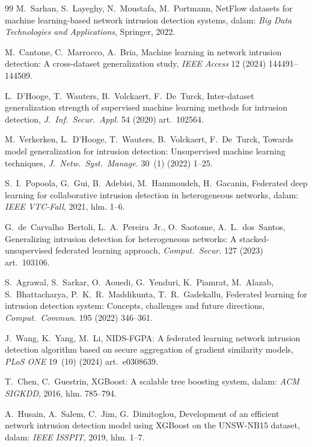 \documentclass[11pt,a4paper]{article}
\begin{document}
\begin{thebibliography}{99}
 M.~Sarhan, S.~Layeghy, N.~Moustafa, M.~Portmann, NetFlow datasets
for machine learning-based network intrusion detection systems, dalam: \emph{Big
Data Technologies and Applications}, Springer, 2022.

 M.~Cantone, C.~Marrocco, A.~Bria, Machine learning in network
intrusion detection: A cross-dataset generalization study, \emph{IEEE Access} 12
(2024) 144491--144509.

 L.~D'Hooge, T.~Wauters, B.~Volckaert, F.~De~Turck, Inter-dataset
generalization strength of supervised machine learning methods for intrusion
detection, \emph{J.\ Inf.\ Secur.\ Appl.} 54 (2020) art.~102564.

 M.~Verkerken, L.~D'Hooge, T.~Wauters, B.~Volckaert, F.~De~Turck,
Towards model generalization for intrusion detection: Unsupervised machine learning
techniques, \emph{J.\ Netw.\ Syst.\ Manage.} 30~(1) (2022) 1--25.

 S.~I.~Popoola, G.~Gui, B.~Adebisi, M.~Hammoudeh, H.~Gacanin,
Federated deep learning for collaborative intrusion detection in heterogeneous
networks, dalam: \emph{IEEE VTC-Fall}, 2021, hlm. 1--6.

 G.~de~Carvalho~Bertoli, L.~A.~Pereira~Jr., O.~Saotome,
A.~L.~dos~Santos, Generalizing intrusion detection for heterogeneous networks: A
stacked-unsupervised federated learning approach, \emph{Comput.\ Secur.} 127 (2023)
art.~103106.

 S.~Agrawal, S.~Sarkar, O.~Aouedi, G.~Yenduri, K.~Piamrat,
M.~Alazab, S.~Bhattacharya, P.~K.~R.~Maddikunta, T.~R.~Gadekallu, Federated learning
for intrusion detection system: Concepts, challenges and future directions,
\emph{Comput.\ Commun.} 195 (2022) 346--361.

 J.~Wang, K.~Yang, M.~Li, NIDS-FGPA: A federated learning network
intrusion detection algorithm based on secure aggregation of gradient similarity
models, \emph{PLoS ONE} 19~(10) (2024) art.~e0308639.

 T.~Chen, C.~Guestrin, XGBoost: A scalable tree boosting system,
dalam: \emph{ACM SIGKDD}, 2016, hlm. 785--794.

 A.~Husain, A.~Salem, C.~Jim, G.~Dimitoglou, Development of an
efficient network intrusion detection model using XGBoost on the UNSW-NB15 dataset,
dalam: \emph{IEEE ISSPIT}, 2019, hlm. 1--7.


\end{thebibliography}
\end{document}
